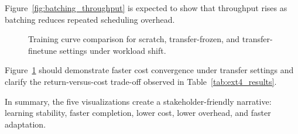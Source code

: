 Figure~\ref{fig:batching_throughput} is expected to show that throughput rises as batching reduces repeated scheduling overhead.

\begin{figure}[H]
\centering
{}
\caption{Training curve comparison for scratch, transfer-frozen, and transfer-finetune settings under workload shift.}
\label{fig:transfer_curves}
\end{figure}

Figure~\ref{fig:transfer_curves} should demonstrate faster cost convergence under transfer settings and clarify the return-versus-cost trade-off observed in Table~\ref{tab:ext4_results}.

In summary, the five visualizations create a stakeholder-friendly narrative: learning stability, faster completion, lower cost, lower overhead, and faster adaptation.
